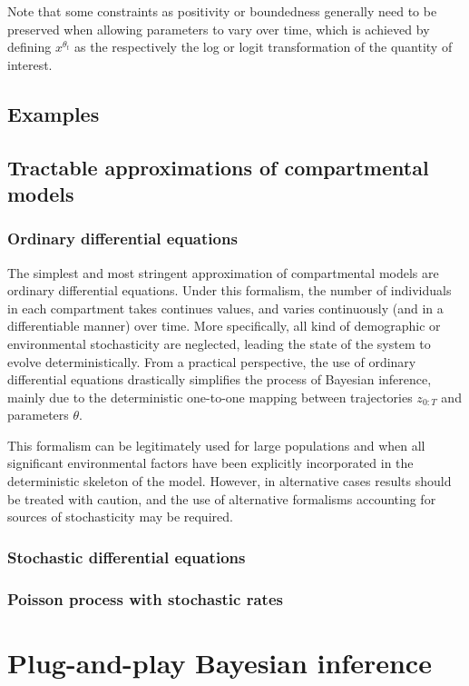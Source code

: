 \documentclass[a4paper,11pt]{article}
\begin{document}
Note that some constraints as positivity or boundedness generally need to be preserved when allowing parameters to vary over time, which is achieved by defining $x^{\theta_t}$ as the respectively the log or logit transformation of the quantity of interest. 


\subsection{Examples}
\subsection{Tractable approximations of compartmental models}
\subsubsection{Ordinary differential equations}

The simplest and most stringent approximation of compartmental models are ordinary differential equations. Under this formalism, the number of individuals in each compartment takes continues values, and varies continuously (and in a differentiable manner) over time. More specifically, all kind of demographic or environmental stochasticity are neglected, leading  the state of the system to evolve deterministically. From a practical perspective, the use of ordinary differential equations drastically simplifies the process of Bayesian inference, mainly due to the deterministic one-to-one mapping between trajectories $z_{0:T}$ and parameters $\theta$.

This formalism can be legitimately used for large populations and when all significant environmental factors have been explicitly incorporated in the deterministic skeleton of the model. However, in alternative cases results should be treated with caution, and the use of alternative formalisms accounting for  sources of stochasticity may be required.



\subsubsection{Stochastic differential equations}
\subsubsection{Poisson process with stochastic rates}
\section{Plug-and-play Bayesian inference}
\end{document}
